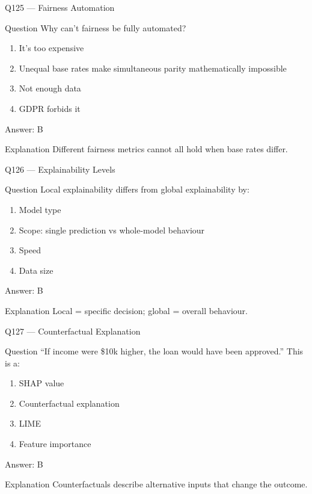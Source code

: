 \documentclass[aspectratio=169,8pt]{beamer}
\begin{document}
	\begin{frame}{Q125 --- Fairness Automation}
		\begin{block}{Question}
			Why can't fairness be fully automated?
		\end{block}
		\begin{enumerate}
			\item It's too expensive
			\item Unequal base rates make simultaneous parity mathematically impossible
			\item Not enough data
			\item GDPR forbids it
		\end{enumerate}
		\begin{exampleblock}{Answer: B}\end{exampleblock}
		\begin{block}{Explanation}
			Different fairness metrics cannot all hold when base rates differ.
		\end{block}
	\end{frame}
	
	\begin{frame}{Q126 --- Explainability Levels}
		\begin{block}{Question}
			Local explainability differs from global explainability by:
		\end{block}
		\begin{enumerate}
			\item Model type
			\item Scope: single prediction vs whole-model behaviour
			\item Speed
			\item Data size
		\end{enumerate}
		\begin{exampleblock}{Answer: B}\end{exampleblock}
		\begin{block}{Explanation}
			Local = specific decision; global = overall behaviour.
		\end{block}
	\end{frame}
	
	\begin{frame}{Q127 --- Counterfactual Explanation}
		\begin{block}{Question}
			``If income were \$10k higher, the loan would have been approved.'' This is a:
		\end{block}
		\begin{enumerate}
			\item SHAP value
			\item Counterfactual explanation
			\item LIME
			\item Feature importance
		\end{enumerate}
		\begin{exampleblock}{Answer: B}\end{exampleblock}
		\begin{block}{Explanation}
			Counterfactuals describe alternative inputs that change the outcome.
		\end{block}
	\end{frame}
	
\end{document}
